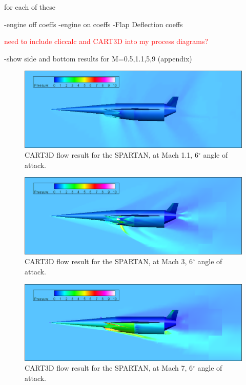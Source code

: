 for each of these

-engine off coeffs
-engine on coeffs
-Flap Deflection coeffs

\textcolor{red}{need to include cliccalc and CART3D into my process diagrams?}


-show side and bottom results for M=0.5,1.1,5,9 (appendix)

\begin{figure}
	\centering
	\includegraphics[width=0.9\linewidth]{figures/3_vehicle_design/M1p1AoA6}
	\caption{CART3D flow result for the SPARTAN, at Mach 1.1, 6$^\circ$ angle of attack.}
	\label{fig:M1}
\end{figure}
\begin{figure}
	\centering
	\includegraphics[width=0.9\linewidth]{figures/3_vehicle_design/M3AoA6}
	\caption{CART3D flow result for the SPARTAN, at Mach 3, 6$^\circ$ angle of attack.}
	\label{fig:M3AoA6}
\end{figure}
\begin{figure}
	\centering
	\includegraphics[width=0.9\linewidth]{figures/3_vehicle_design/M7AoA6}
	\caption{CART3D flow result for the SPARTAN, at Mach 7, 6$^\circ$ angle of attack.}
	\label{fig:M7AoA6}
\end{figure}


